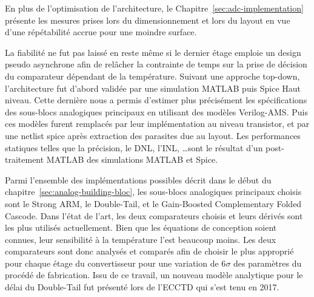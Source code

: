 \begin{mdframed}[linecolor=Prune,linewidth=1]
En plus de l'optimisation de l'architecture, le Chapitre~\ref{sec:adc-implementation} présente les mesures prises lors du dimensionnement et lors du layout en vue d'une répétabilité accrue pour une moindre surface.

La fiabilité ne fut pas laissé en reste même si le dernier étage emploie un design pseudo asynchrone afin de relâcher la contrainte de temps sur la prise de décision du comparateur dépendant de la température. Suivant une approche top-down, l'architecture fut d'abord validée par une simulation MATLAB puis Spice Haut niveau. Cette dernière nous a permis d'estimer plus précisément les spécifications des sous-blocs analogiques principaux en utilisant des modèles Verilog-AMS\@. Puis ces modèles furent remplacés par leur implémentation au niveau transistor, et par une netlist spice après extraction des parasites due au layout. Les performances statiques telles que la précision, le DNL, l'INL, \ldots sont le résultat d'un post-traitement MATLAB des simulations MATLAB et Spice.

Parmi l'ensemble des implémentations possibles décrit dans le début du chapitre~\ref{sec:analog-building-bloc}, les sous-blocs analogiques principaux choisis sont le Strong ARM, le Double-Tail, et le Gain-Boosted Complementary Folded Cascode. Dans l'état de l'art, les deux comparateurs choisis et leurs dérivés sont les plus utilisés actuellement. Bien que les équations de conception soient connues, leur sensibilité à la température l'est beaucoup moins. Les deux comparateurs sont donc analysés et comparés afin de choisir le plus approprié pour chaque étage du convertisseur pour une variation de 6$\sigma$ des paramètres du procédé de fabrication. Issu de ce travail, un nouveau modèle analytique pour le délai du Double-Tail fut présenté lors de l'ECCTD qui s'est tenu en 2017.


\end{mdframed}
